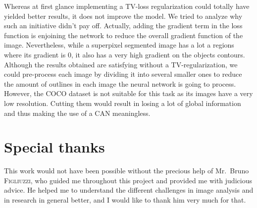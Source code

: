 \documentclass{article}
\begin{document}
    Whereas at first glance implementing a TV-loss regularization could totally have yielded better results, it does not improve the model. We tried to analyze why such an initiative didn't pay off. Actually, adding the gradient term in the loss function is enjoining the network to reduce the overall gradient function of the image. Nevertheless, while a superpixel segmented image has a lot a regions where its gradient is 0, it also has a very high gradient on the objects contours.
    Although the results obtained are satisfying without a TV-regularization, we could pre-process each image by dividing it into several smaller ones to reduce the amount of outlines in each image the neural network is going to process. However, the COCO dataset is not suitable for this task as its images have a very low resolution. Cutting them would result in losing a lot of global information and thus making the use of a CAN meaningless.


\section*{Special thanks}
This work would not have been possible without the precious help of Mr.~Bruno \textsc{Figliuzzi}, who guided me throughout this project and provided me with judicious advice. He helped me to understand the different challenges in image analysis and in research in general better, and I would like to thank him very much for that.



\end{document}
